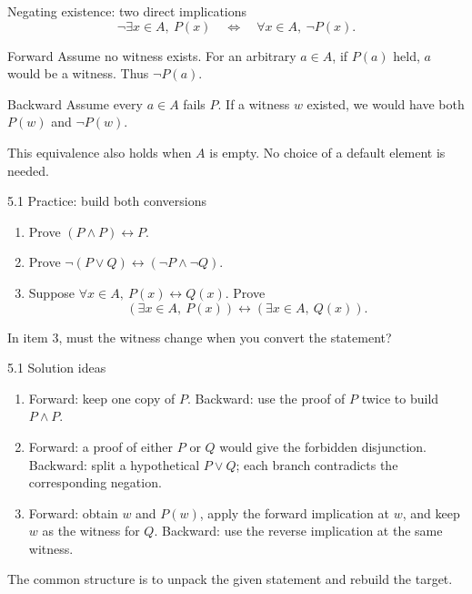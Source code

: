 \begin{frame}{Negating existence: two direct implications}
\[
\neg\exists x\in A,\ P(x)\quad\Longleftrightarrow\quad
\forall x\in A,\ \neg P(x).
\]
\begin{block}{Forward}
Assume no witness exists. For an arbitrary $a\in A$, if $P(a)$ held, $a$ would be a witness. Thus $\neg P(a)$.
\end{block}
\begin{block}{Backward}
Assume every $a\in A$ fails $P$. If a witness $w$ existed, we would have both $P(w)$ and $\neg P(w)$.
\end{block}
This equivalence also holds when $A$ is empty. No choice of a default element is needed.
\end{frame}

\begin{frame}{5.1 Practice: build both conversions}
\begin{enumerate}
\item Prove $(P\land P)\leftrightarrow P$.
\item Prove $\neg(P\lor Q)\leftrightarrow(\neg P\land\neg Q)$.
\item Suppose $\forall x\in A,\ P(x)\leftrightarrow Q(x)$. Prove
\[
(\exists x\in A,\ P(x))\leftrightarrow(\exists x\in A,\ Q(x)).
\]
\end{enumerate}
In item 3, must the witness change when you convert the statement?
\end{frame}

\begin{frame}{5.1 Solution ideas}
\begin{enumerate}
\item Forward: keep one copy of $P$. Backward: use the proof of $P$ twice to build $P\land P$.
\item Forward: a proof of either $P$ or $Q$ would give the forbidden disjunction. Backward: split a hypothetical $P\lor Q$; each branch contradicts the corresponding negation.
\item Forward: obtain $w$ and $P(w)$, apply the forward implication at $w$, and keep $w$ as the witness for $Q$. Backward: use the reverse implication at the same witness.
\end{enumerate}
The common structure is to unpack the given statement and rebuild the target.
\end{frame}


